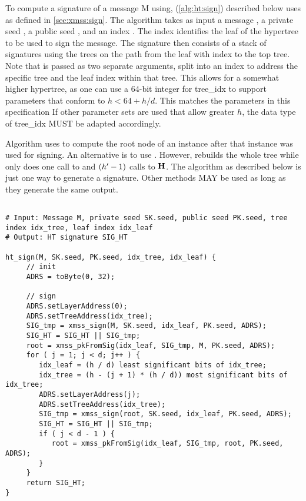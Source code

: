    To compute a \hyper signature \htsig of a message M using, \htsign
   (\autoref{alg:ht:sign}) described below
   uses \xmsssign as defined in \autoref{sec:xmss:sign}.
   The algorithm \htsign takes as input a message \msg, a private seed \sseed,
   a public seed \pseed, and an index \idx. The index identifies the leaf
   of the hypertree to be used to sign the message. The \hyper signature then
   consists of a stack of \xmss signatures using the \xmss trees on the path
   from the leaf with index \idx  to the top tree. Note that \idx is passed as two
   separate arguments, split into an index to address the specific tree and the
   leaf index within that tree. This allows for a somewhat higher hypertree,
   as one can use a 64-bit integer for tree\_idx to support parameters that
   conform to $h < 64 + h / d$. This matches the parameters in this specification
   If other parameter sets are used that allow greater $h$,
   the data type of tree\_idx MUST be adapted accordingly.

   Algorithm \htsign uses \xmsspkfromsig to compute the root node of an
   \xmss instance after that instance was used for signing. An alternative is
   to use \xmsspkgen. However, \xmsspkgen rebuilds the whole tree while
   \xmsspkfromsig only does one call to \wotspkfromsig and $({h'}-1)$ calls
   to $\mathbf{H}$. The algorithm \htsign as described below is just one way
   to generate a \hyper signature. Other methods MAY be used as long as they
   generate the same output.

\begin{lstlisting}[label=alg:ht:sign, breaklines=true, mathescape, language=pseudoc,
                   caption=\htsign\ -- Generating an \hyper signature]

# Input: Message M, private seed SK.seed, public seed PK.seed, tree index idx_tree, leaf index idx_leaf
# Output: HT signature SIG_HT

ht_sign(M, SK.seed, PK.seed, idx_tree, idx_leaf) {
     // init
     ADRS = toByte(0, 32);

     // sign
     ADRS.setLayerAddress(0);
     ADRS.setTreeAddress(idx_tree);
     SIG_tmp = xmss_sign(M, SK.seed, idx_leaf, PK.seed, ADRS);
     SIG_HT = SIG_HT || SIG_tmp;
     root = xmss_pkFromSig(idx_leaf, SIG_tmp, M, PK.seed, ADRS);
     for ( j = 1; j < d; j++ ) {
        idx_leaf = (h / d) least significant bits of idx_tree;
        idx_tree = (h - (j + 1) * (h / d)) most significant bits of idx_tree;
        ADRS.setLayerAddress(j);
        ADRS.setTreeAddress(idx_tree);
        SIG_tmp = xmss_sign(root, SK.seed, idx_leaf, PK.seed, ADRS);
        SIG_HT = SIG_HT || SIG_tmp;
        if ( j < d - 1 ) {
           root = xmss_pkFromSig(idx_leaf, SIG_tmp, root, PK.seed, ADRS);
        }
     }
     return SIG_HT;
}
\end{lstlisting}

